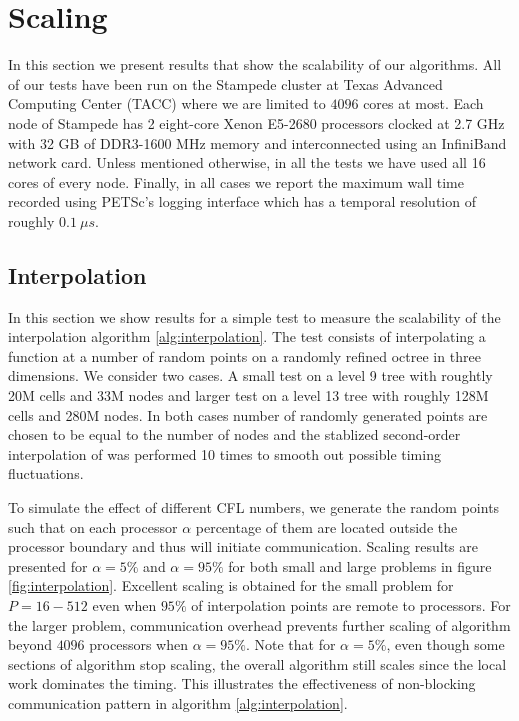 \section{Scaling} \label{sec:scaling}
In this section we present results that show the scalability of our algorithms. All of our tests have been run on the Stampede cluster at Texas Advanced Computing Center (TACC) where we are limited to $4096$ cores at most. Each node of Stampede has 2 eight-core Xenon E5-2680 processors clocked at 2.7 GHz with 32 GB of DDR3-1600 MHz memory and interconnected using an InfiniBand network card. Unless mentioned otherwise, in all the tests we have used all 16 cores of every node. Finally, in all cases we report the maximum wall time recorded using PETSc's logging interface which has a temporal resolution of roughly $0.1 \: \mu s$.

\subsection{Interpolation}
In this section we show results for a simple test to measure the scalability of the interpolation algorithm \ref{alg:interpolation}. The test consists of interpolating a function at a number of random points on a randomly refined octree in three dimensions. We consider two cases. A small test on a level 9 tree with roughtly 20M cells and 33M nodes and larger test on a level 13 tree with roughly 128M cells and 280M nodes. In both cases number of randomly generated points are chosen to be equal to the number of nodes and the stablized second-order interpolation of \cite{Min;Gibou:07:A-second-order-accur} was performed 10 times to smooth out possible timing fluctuations.

To simulate the effect of different CFL numbers, we generate the random points such that on each processor $\alpha$ percentage of them are located outside the processor boundary and thus will initiate communication. Scaling results are presented for $\alpha = 5 \%$ and $\alpha = 95\%$ for both small and large problems in figure \ref{fig:interpolation}. Excellent scaling is obtained for the small problem for $P = 16-512$ even when $95\%$ of interpolation points are remote to processors. For the larger problem, communication overhead prevents further scaling of algorithm beyond $4096$ processors when $\alpha = 95\%$. Note that for $\alpha = 5\%$, even though some sections of algorithm stop scaling, the overall algorithm still scales since the local work dominates the timing. This illustrates the effectiveness of non-blocking communication pattern in algorithm \ref{alg:interpolation}.

